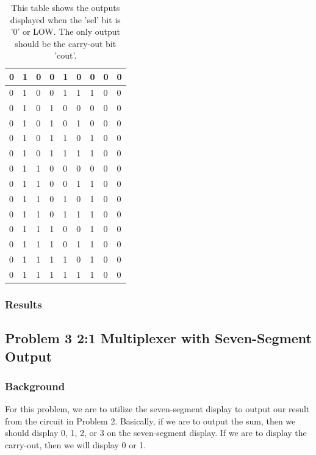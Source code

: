 \documentclass[11pt]{article}
\begin{document}
\begin{table}[H]
\begin{center}
\begin{tabular}{| l | l | l | l | l | l | l | l | l |}
		0 & 1 & 0 & 0 & 1 & 0 & 0 & 0 & 0 \\ \hline
		0 & 1 & 0 & 0 & 1 & 1 & 1 & 0 & 0 \\ \hline
		0 & 1 & 0 & 1 & 0 & 0 & 0 & 0 & 0 \\ \hline
		0 & 1 & 0 & 1 & 0 & 1 & 0 & 0 & 0 \\ \hline
		0 & 1 & 0 & 1 & 1 & 0 & 1 & 0 & 0 \\ \hline
		0 & 1 & 0 & 1 & 1 & 1 & 1 & 0 & 0 \\ \hline
		0 & 1 & 1 & 0 & 0 & 0 & 0 & 0 & 0 \\ \hline
		0 & 1 & 1 & 0 & 0 & 1 & 1 & 0 & 0 \\ \hline
		0 & 1 & 1 & 0 & 1 & 0 & 1 & 0 & 0 \\ \hline
		0 & 1 & 1 & 0 & 1 & 1 & 1 & 0 & 0 \\ \hline
		0 & 1 & 1 & 1 & 0 & 0 & 1 & 0 & 0 \\ \hline
		0 & 1 & 1 & 1 & 0 & 1 & 1 & 0 & 0 \\ \hline
		0 & 1 & 1 & 1 & 1 & 0 & 1 & 0 & 0 \\ \hline
		0 & 1 & 1 & 1 & 1 & 1 & 1 & 0 & 0 \\ \hline
	\end{tabular}
	\caption{\label{tab:selZeroTruthTable}This table shows the outputs displayed when the 'sel' bit is '0' or LOW. The only output should be the carry-out bit 'cout'.}
\end{center}
\end{table}

\subsubsection{Results}


\subsection{Problem 3 2:1 Multiplexer with Seven-Segment Output}

\subsubsection{Background}
For this problem, we are to utilize the seven-segment display to output our result from the circuit in Problem 2. Basically, if we are to output the sum, then we should display 0, 1, 2, or 3 on the seven-segment display. If we are to display the carry-out, then we will display 0 or 1.
\end{document}
